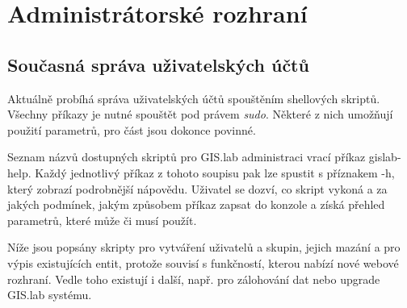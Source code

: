 \chapter{Administrátorské rozhraní}
\label{4-praxe}

\section{Současná správa uživatelských účtů}
\label{cmd-line}

Aktuálně probíhá správa uživatelských účtů spouštěním shellových skriptů. Všechny příkazy je nutné spouštět pod právem \textit{sudo}. Některé z nich umožňují použití parametrů, pro část jsou dokonce povinné.

Seznam názvů dostupných skriptů pro GIS.lab administraci vrací příkaz \textsf{gislab-help}. Každý jednotlivý příkaz z tohoto soupisu pak lze spustit s příznakem \textsf{-h}, který zobrazí podrobnější nápovědu. Uživatel se dozví, co skript vykoná a za jakých podmínek, jakým způsobem příkaz zapsat do konzole a získá přehled parametrů, které může či musí použít.

Níže jsou popsány skripty pro vytváření uživatelů a skupin, jejich mazání a pro výpis existujících entit, protože souvisí s funkčností, kterou nabízí nové webové rozhraní. Vedle toho existují i další, např. pro zálohování dat nebo upgrade GIS.lab systému.


